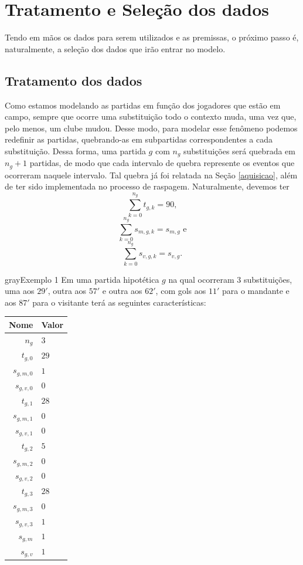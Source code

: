 \section{Tratamento e Seleção dos dados}

Tendo em mãos os dados para serem utilizados e as premissas, o próximo passo é, naturalmente, a seleção dos dados que irão entrar no modelo.

\subsection{Tratamento dos dados}
\label{tratamento_dos_dados}

Como estamos modelando as partidas em função dos jogadores que estão em campo, sempre que ocorre uma substituição todo o contexto muda, uma vez que, pelo menos, um clube mudou. Desse modo, para modelar esse fenômeno podemos redefinir as partidas, quebrando-as em subpartidas correspondentes a cada substituição. Dessa forma, uma partida $g$ com $n_g$ substituições será quebrada em $n_g + 1$ partidas, de modo que cada intervalo de quebra represente os eventos que ocorreram naquele intervalo. Tal quebra já foi relatada na Seção \ref{aquisicao}, além de ter sido implementada no processo de raspagem. Naturalmente, devemos ter
\[\sum_{k = 0}^{n_g} t_{g, k} = 90,\]
\[\sum_{k = 0}^{n_g} s_{m, g, k} = s_{m, g} \text{ e}\]
\[\sum_{k = 0}^{n_g} s_{v, g, k} = s_{v, g}.\]

\begin{mybox}{gray}{Exemplo 1}
    Em uma partida hipotética $g$ na qual ocorreram $3$ substituições, uma aos $29'$, outra aos $57'$ e outra aos $62'$, com gols aos $11'$ para o mandante e aos $87'$ para o visitante terá as seguintes características:
    \begin{table}[H]
        \centering
        \begin{tabular}{r|l}
            Nome & Valor \\ \hline
            $n_g$ & $3$ \\
            $t_{g, 0}$ & $29$ \\
            $s_{g, m, 0}$ & $1$ \\
            $s_{g, v, 0}$ & $0$ \\
            $t_{g, 1}$ & $28$ \\
            $s_{g, m, 1}$ & $0$ \\
            $s_{g, v, 1}$ & $0$ \\
            $t_{g, 2}$ & $5$ \\
            $s_{g, m, 2}$ & $0$ \\
            $s_{g, v, 2}$ & $0$ \\
            $t_{g, 3}$ & $28$ \\
            $s_{g, m, 3}$ & $0$ \\
            $s_{g, v, 3}$ & $1$ \\
            $s_{g, m}$ & $1$ \\
            $s_{g, v}$ & $1$
        \end{tabular}
    \end{table}
\end{mybox}

